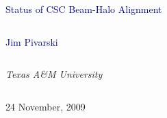 \documentclass[compress]{beamer}
\begin{document}
\begin{frame}
\vfill
\begin{center}
\textcolor{darkblue}{\Large Status of CSC Beam-Halo Alignment}

\vfill
\begin{columns}
\begin{center}
\large
\textcolor{darkblue}{Jim Pivarski}
\end{center}
\end{columns}

\begin{columns}
\begin{center}
\scriptsize
{\it Texas A\&M University}
\end{center}
\end{columns}

\vfill
24 November, 2009

\end{center}
\end{frame}


\small
\end{document}

